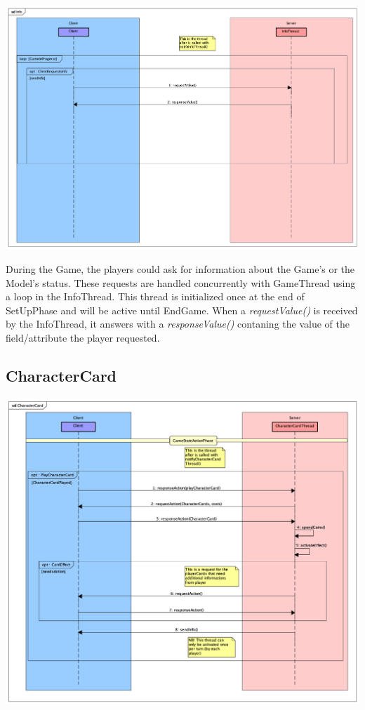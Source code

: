 \documentclass[12pt]{article}
\begin{document}
			\begin{center}
				\includegraphics[width=\textwidth,height=\textheight,keepaspectratio]{Info}
			\end{center}
			
			During the Game, the players could ask for information about the Game's or the Model's status. These requests are handled concurrently with GameThread using a loop in the InfoThread. This thread is initialized once at the end of SetUpPhase and will be active until EndGame. When a \emph{requestValue()} is received by the InfoThread, it answers with a \emph{responseValue()} contaning the value of the field/attribute the player requested.
			
		\subsection{CharacterCard}
		
			\begin{center}
				\includegraphics[width=\textwidth,height=\textheight,keepaspectratio]{CharacterCard}
			\end{center}
		
\end{document}

